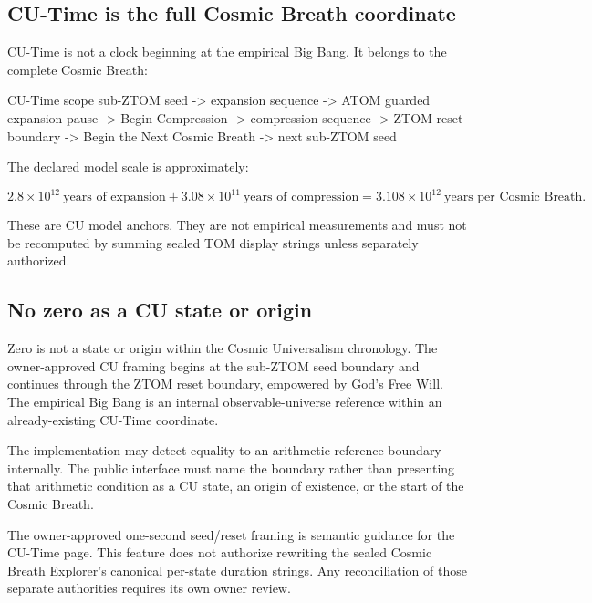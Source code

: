 \documentclass[11pt,letterpaper]{article}
\begin{document}
\subsection{CU-Time is the full Cosmic Breath coordinate}

CU-Time is not a clock beginning at the empirical Big Bang. It belongs to the
complete Cosmic Breath:

\begin{codebox}{CU-Time scope}
sub-ZTOM seed
  -> expansion sequence
  -> ATOM guarded expansion pause
  -> Begin Compression
  -> compression sequence
  -> ZTOM reset boundary
  -> Begin the Next Cosmic Breath
  -> next sub-ZTOM seed
\end{codebox}

The declared model scale is approximately:

\[
2.8\times 10^{12}\ \text{years of expansion}
+
3.08\times 10^{11}\ \text{years of compression}
=
3.108\times 10^{12}\ \text{years per Cosmic Breath}.
\]

These are CU model anchors. They are not empirical measurements and must not be
recomputed by summing sealed TOM display strings unless separately authorized.

\subsection{No zero as a CU state or origin}

\begin{authoritybox}
Zero is not a state or origin within the Cosmic Universalism chronology. The
owner-approved CU framing begins at the sub-ZTOM seed boundary and continues
through the ZTOM reset boundary, empowered by God's Free Will. The empirical
Big Bang is an internal observable-universe reference within an already-existing
CU-Time coordinate.
\end{authoritybox}

The implementation may detect equality to an arithmetic reference boundary
internally. The public interface must name the boundary rather than presenting
that arithmetic condition as a CU state, an origin of existence, or the start
of the Cosmic Breath.

\begin{notebox}
The owner-approved one-second seed/reset framing is semantic guidance for the
CU-Time page. This feature does not authorize rewriting the sealed Cosmic
Breath Explorer's canonical per-state duration strings. Any reconciliation of
those separate authorities requires its own owner review.
\end{notebox}
\end{document}
